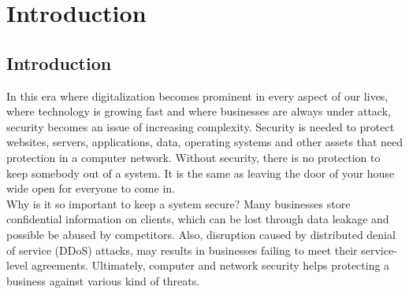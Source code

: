 \chapter{Introduction}
\label{cha:10}
%


\section{Introduction}


In this era where digitalization becomes prominent in every aspect of our lives, where technology is growing fast and where businesses are always under attack, security becomes an issue of increasing complexity. Security is needed to protect websites, servers, applications, data, operating systems and other assets that need protection in a computer network. Without security, there is no protection to keep somebody out of a system. It is the same as leaving the door of your house wide open for everyone to come in. \\

Why is it so important to keep a system secure?  Many businesses store confidential information on clients, which can be lost through data leakage and possible be abused by competitors. Also, disruption caused by distributed denial of service (DDoS) attacks, may results in businesses failing to meet their service-level agreements. Ultimately, computer and network security helps protecting a business against various kind of threats. \\

